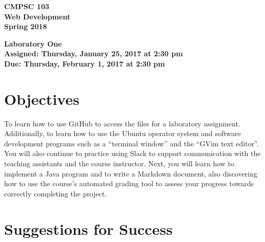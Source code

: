 \documentclass[11pt]{article}
\newcommand{\assignmentduedate}{February 1}
\newcommand{\assignmentassignedate}{January 25}
\newcommand{\assignmentnumber}{One}
\newcommand{\labyear}{2017}
\newcommand{\labday}{Thursday}
\newcommand{\labtime}{2:30 pm}
\newcommand{\assigneddate}{Assigned: \labday, \assignmentassignedate, \labyear{} at \labtime{}}
\newcommand{\duedate}{Due: \labday, \assignmentduedate, \labyear{} at \labtime{}}
\newcommand{\labtitle}[1]
{
  \begin{center}
    \begin{center}
      \bf
      CMPSC 103\\Web Development\\
      Spring 2018\\
      \medskip
    \end{center}
    \bf
    #1
  \end{center}
}
\begin{document}
\thispagestyle{empty}

\labtitle{Laboratory \assignmentnumber{} \\ \assigneddate{} \\ \duedate{}}

\section*{Objectives}

To learn how to use GitHub to access the files for a laboratory assignment. Additionally, to learn how to use the Ubuntu
operator system and software development programs such as a ``terminal window'' and the ``GVim text editor''. You will
also continue to practice using Slack to support communication with the teaching assistants and the course instructor.
Next, you will learn how to implement a Java program and to write a Markdown document, also discovering how to use the
course's automated grading tool to assess your progress towards correctly completing the project.

\section*{Suggestions for Success}
\end{document}

